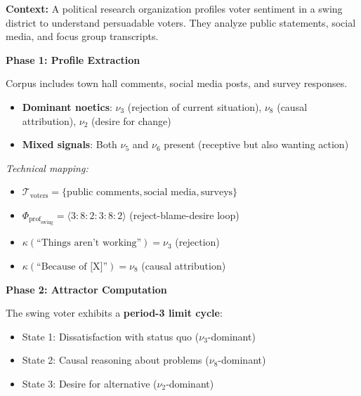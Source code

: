 \documentclass[11pt,twoside]{book}
\newcommand{\noe}[1]{\nu_{#1}}
\newcommand{\ProfileFrac}{\Phi_{\mathrm{prof}}}
\newcommand{\TextCorpus}{\mathcal{T}}
\begin{document}
\begin{tcolorbox}[colback=yellow!5!white,colframe=yellow!65!black,title=\textbf{Scenario 3: Political Application --- Voter Sentiment Analysis},breakable]

\textbf{Context:}
A political research organization profiles voter sentiment in a swing district to understand
persuadable voters. They analyze public statements, social media, and focus group transcripts.

\textbf{Phase 1: Profile Extraction}

Corpus includes town hall comments, social media posts, and survey responses.
\begin{itemize}
    \item \textbf{Dominant noetics}: $\noe{3}$ (rejection of current situation), $\noe{8}$ (causal attribution),
          $\noe{2}$ (desire for change)
    \item \textbf{Mixed signals}: Both $\noe{5}$ and $\noe{6}$ present (receptive but also wanting action)
\end{itemize}

\textit{Technical mapping:}
\begin{itemize}
    \item $\TextCorpus_{\mathrm{voters}} = \{\text{public comments}, \text{social media}, \text{surveys}\}$
    \item $\ProfileFrac_{\mathrm{swing}} = \langle 3:8:2:3:8:2 \rangle$ (reject-blame-desire loop)
    \item $\kappa(\text{``Things aren't working''}) = \noe{3}$ (rejection)
    \item $\kappa(\text{``Because of [X]''}) = \noe{8}$ (causal attribution)
\end{itemize}

\textbf{Phase 2: Attractor Computation}

The swing voter exhibits a \textbf{period-3 limit cycle}:
\begin{itemize}
    \item State 1: Dissatisfaction with status quo ($\noe{3}$-dominant)
    \item State 2: Causal reasoning about problems ($\noe{8}$-dominant)
    \item State 3: Desire for alternative ($\noe{2}$-dominant)
\end{itemize}


\end{tcolorbox}
\end{document}
